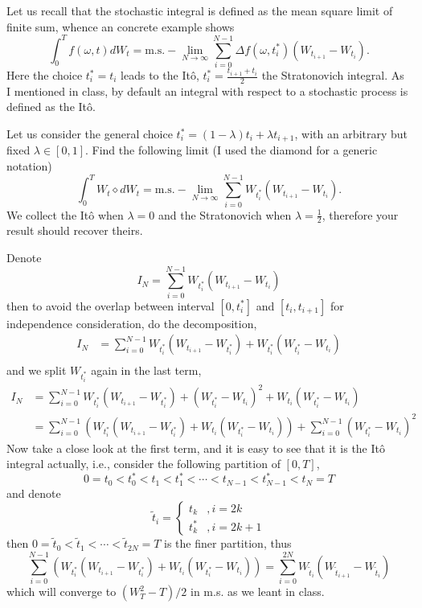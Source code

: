     \problem
    \begin{question}
        Let us recall that the stochastic integral is defined as the mean square
        limit of finite sum, whence an concrete example shows
        \[\int_0^T f(\omega,t)dW_t=\text{m.s.}-\lim_{N\rightarrow\infty}
        \sum^{N-1}_{i=0}\Delta f(\omega,t^*_i)(W_{t_{i+1}}-W_{t_{i}}).\]
        Here the choice $t^*_i=t_i$ leads to the It\^o, $t^*_i=\frac{t_{i+1}+t_{i}}{2}$
        the Stratonovich integral.  As I mentioned in class, by default an integral
        with respect to a stochastic process is defined as the It\^o.

        Let us consider the general choice $t^*_i=(1-\lambda)t_i+\lambda t_{i+1}$,
        with an arbitrary but fixed $\lambda\in[0,1]$.  Find the following limit
        (I used the diamond for a generic notation)
        \[\int_0^T W_t \diamond dW_t=\text{m.s.}-\lim_{N\rightarrow\infty}\sum^{N-1}_{i=0} W_{t^*_i}(W_{t_{i+1}}-W_{t_{i}}).\]
        We collect the It\^o when $\lambda=0$ and the Stratonovich when
        $\lambda=\frac{1}{2}$, therefore your result should recover theirs. 
    \end{question}
    Denote
    \[I_N=\sum_{i=0}^{N-1}W_{t_i^*}(W_{t_{i+1}}-W_{t_i})\]
    then to avoid the overlap between interval $[0,t_i^*]$ and $[t_i,t_{i+1}]$
    for independence consideration, do the decomposition,
    \[\begin{aligned}
        I_N&=\sum_{i=0}^{N-1}W_{t_i^*}(W_{t_{i+1}}-W_{t_i^*})
        +W_{t_i^*}(W_{t_i^*}-W_{t_i})\\
    \end{aligned}\]
    and we split $W_{t_i^*}$ again in the last term,
    \[\begin{aligned}
        I_N&=\sum_{i=0}^{N-1}W_{t_i^*}(W_{t_{i+1}}-W_{t_i^*})
        +(W_{t_i^*}-W_{t_i})^2+W_{t_i}(W_{t_i^*}-W_{t_i})\\
        &=\sum_{i=0}^{N-1}\left(W_{t_i^*}(W_{t_{i+1}}-W_{t_i^*})
            +W_{t_i}(W_{t_i^*}-W_{t_i})\right)
          +\sum_{i=0}^{N-1}(W_{t_i^*}-W_{t_i})^2
    \end{aligned}\]
    Now take a close look at the first term, and it is easy to
    see that it is the It\^o  integral actually, i.e., consider
    the following partition of $[0,T]$,
    \[0=t_0<t_0^*<t_1<t_1^*<\cdots<t_{N-1}<t_{N-1}^*<t_N=T\]
    and denote 
    \[\tilde t_i=\begin{cases}
        t_k&,i=2k\\
        t_k^*&,i=2k+1
    \end{cases}\]
    then $0=\tilde t_0<\tilde t_1<\cdots<\tilde t_{2N}=T$ is the finer
    partition, thus
    \[\sum_{i=0}^{N-1}\left(W_{t_i^*}(W_{t_{i+1}}-W_{t_i^*})
            +W_{t_i}(W_{t_i^*}-W_{t_i})\right)
    =\sum_{i=0}^{2N}W_{\tilde t_i}(W_{\tilde t_{i+1}}-W_{\tilde t_i})\]
    which will converge to $(W_T^2-T)/2$ in m.s. as we leant
    in class.

